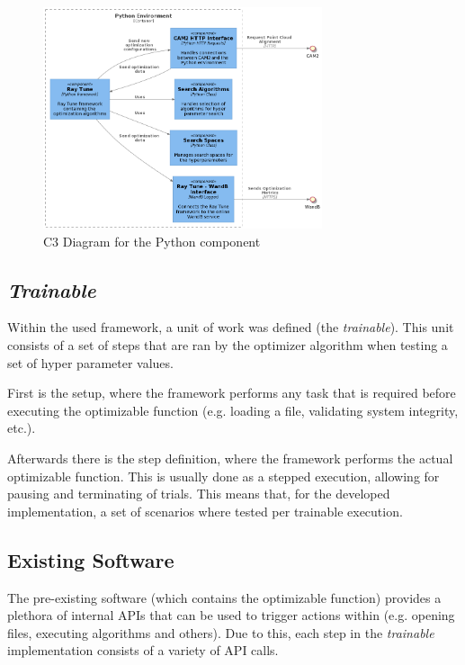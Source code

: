 \documentclass[runningheads]{llncs}
\begin{document}
\begin{figure}[htb]
	\centering
	\includegraphics[width=0.73\textwidth]{images/c3_python.png}
	\caption{C3 Diagram for the Python component}
	\label{fig:c3}
\end{figure}

\subsection{\textit{Trainable}}

Within the used framework, a unit of work was defined (the \textit{trainable}). This unit consists of a set of steps that are ran by the optimizer algorithm when testing a set of hyper parameter values.

First is the setup, where the framework performs any task that is required before executing the optimizable function (e.g. loading a file, validating system integrity, etc.).

Afterwards there is the step definition, where the framework performs the actual optimizable function. This is usually done as a stepped execution, allowing for pausing and terminating of trials. This means that, for the developed implementation, a set of scenarios where tested per trainable execution.

\subsection{Existing Software}

The pre-existing software (which contains the optimizable function) provides a plethora of internal APIs that can be used to trigger actions within (e.g. opening files, executing algorithms and others). Due to this, each step in the \textit{trainable} implementation consists of a variety of API calls.
\end{document}
